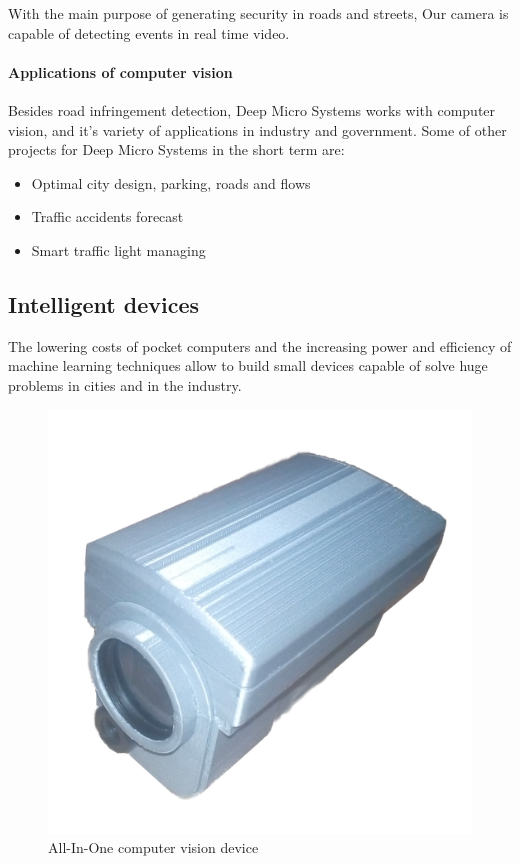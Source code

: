 \documentclass[fleqn,12pt]{SelfArx} %
\begin{document}
With the main purpose of generating security in roads and streets, Our camera is capable of detecting events in real time video.

\paragraph{Applications of computer vision} Besides road infringement detection, Deep Micro Systems works with computer vision, and it's variety of applications in industry and government. Some of other projects for Deep Micro Systems in the short term are:

\begin{itemize}[noitemsep] %
\item Optimal city design, parking, roads and flows
\item Traffic accidents forecast
\item Smart traffic light managing
\end{itemize}

\subsection{Intelligent devices}

The lowering costs of pocket computers and the increasing power and efficiency of machine learning techniques allow to build small devices capable of solve huge problems in cities and in the industry.

\begin{figure}[hb]\centering
	\includegraphics[width=\linewidth]{images/lucam_005}
	\caption{All-In-One computer vision device}
	\label{fig:device}
\end{figure}
\end{document}
